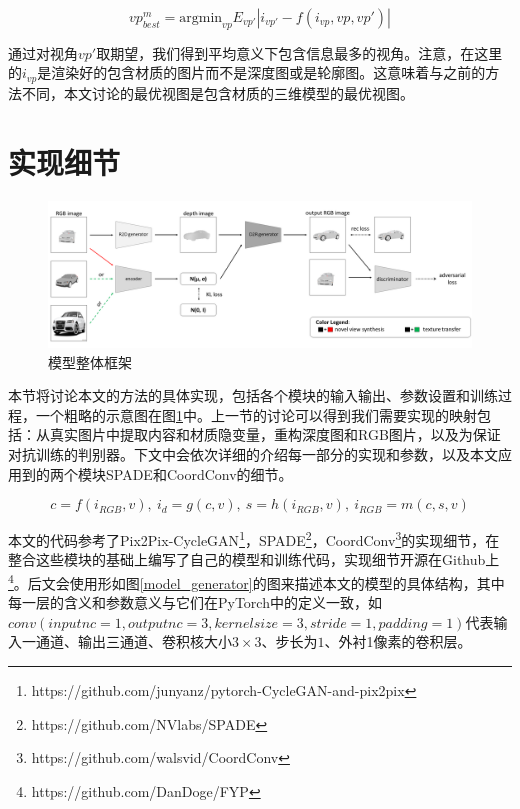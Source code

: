 \documentclass[UTF8,openany,AutoFakeBold,AutoFakeSlant,cs4size]{ctexbook}
\begin{document}
\begin{equation}
	vp_{best}^{m} = \mbox{argmin}_{vp} E_{vp'} | i_{vp'} - f(i_{vp}, vp, vp')|
\end{equation}


通过对视角$vp'$取期望，我们得到平均意义下包含信息最多的视角。注意，在这里的$i_{vp}$是渲染好的包含材质的图片而不是深度图或是轮廓图。这意味着与之前的方法不同，本文讨论的最优视图是包含材质的三维模型的最优视图。

\section{实现细节}

\begin{figure}
\centering
\includegraphics[width=\linewidth]{./images/banner.png}
\caption{模型整体框架}
\label{model_architecture}
\end{figure}

本节将讨论本文的方法的具体实现，包括各个模块的输入输出、参数设置和训练过程，一个粗略的示意图在图\ref{model_architecture}中。上一节的讨论可以得到我们需要实现的映射包括：从真实图片中提取内容和材质隐变量，重构深度图和RGB图片，以及为保证对抗训练的判别器。下文中会依次详细的介绍每一部分的实现和参数，以及本文应用到的两个模块SPADE\cite{park2019SPADE}和CoordConv\cite{NIPS2018_8169}的细节。

\begin{equation}
	c = f(i_{RGB}, v),\ i_d = g(c, v),\ s = h(i_{RGB}, v),\ i_{RGB} = m(c, s, v)
\end{equation}


本文的代码参考了Pix2Pix-CycleGAN\footnote{https://github.com/junyanz/pytorch-CycleGAN-and-pix2pix}，SPADE\footnote{https://github.com/NVlabs/SPADE}，CoordConv\footnote{https://github.com/walsvid/CoordConv}的实现细节，在整合这些模块的基础上编写了自己的模型和训练代码，实现细节开源在Github上\footnote{https://github.com/DanDoge/FYP}。后文会使用形如图\ref{model_generator}的图来描述本文的模型的具体结构，其中每一层的含义和参数意义与它们在PyTorch\cite{NEURIPS2019_9015}中的定义一致，如$conv(inputnc=1, outputnc=3, kernelsize=3, stride=1, padding=1)$代表输入一通道、输出三通道、卷积核大小$3 \times 3$、步长为$1$、外衬1像素的卷积层。
\end{document}

